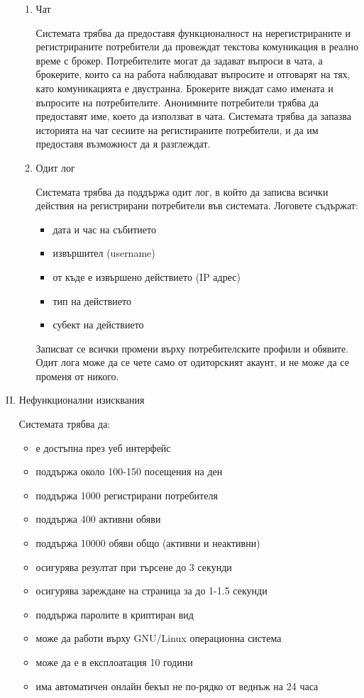 \documentclass[]{article}
\begin{document}
\begin{enumerate}[I.]
{\begin{enumerate}[1.]
			\item {Чат
			
				Системата трябва да предоставя функционалност на нерегистрираните и регистрираните потребители да провеждат текстова комуникация в реално време с брокер. Потребителите могат да задават въпроси в чата, а брокерите, които са на работа наблюдават въпросите и отговарят на тях, като комуникацията е двустранна. Брокерите виждат само имената и въпросите на потребителите. Анонимните потребители трябва да предоставят име, което да използват в чата. Системата трябва да запазва историята на чат сесиите на регистираните потребители, и да им предоставя възможност да я разглеждат.
			}


			\item {Одит лог

				Системата трябва да поддържа одит лог, в който да записва всички действия на регистрирани потребители във системата. Логовете съдържат:
				\begin{itemize}
					\item дата и час на събитието
					\item извършител (username)
					\item от къде е извършено действието (IP адрес)
					\item тип на действието
					\item субект на действието
				\end{itemize}
  				Записват се всички промени върху потребителските профили и обявите. 	Одит лога може да се чете само от одиторският акаунт, и не може да се променя от никого.
			}
			
		\end{enumerate}
		
	}
	\item {Нефункционални изисквания
	
		Системата трябва да:
		\begin{itemize}
			\item е достъпна през уеб интерфейс
			\item поддържа около 100-150 посещения на ден
			\item поддържа 1000 регистрирани потребителя
			\item поддържа 400 активни обяви
			\item поддържа 10000 обяви общо (активни и неактивни)
			\item осигурява резултат при търсене до 3 секунди
			\item осигурява зареждане на страница за до 1-1.5 секунди
			\item поддържа паролите в криптиран вид
			\item може да работи върху GNU/Linux операционна система
			\item може да е в експлоатация 10 години
			\item има автоматичен онлайн бекъп не по-рядко от веднъж на 24 часа
		\end{itemize}
		
}
\end{enumerate}
\end{document}
